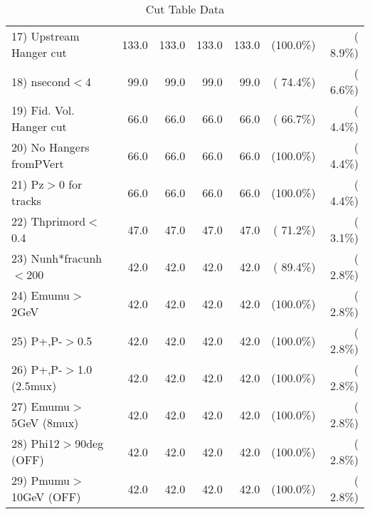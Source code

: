 \begin{table}[h!]
\begin{tabular}{||l||r|r|r|r|r|r||}
 17) Upstream Hanger cut  &        133.0 &        133.0 &        133.0 &        133.0 & (100.0\%) & (  8.9\%) \\
 18) nsecond$<$4          &         99.0 &         99.0 &         99.0 &         99.0 & ( 74.4\%) & (  6.6\%) \\
 19) Fid. Vol. Hanger cut &         66.0 &         66.0 &         66.0 &         66.0 & ( 66.7\%) & (  4.4\%) \\
 20) No Hangers fromPVert &         66.0 &         66.0 &         66.0 &         66.0 & (100.0\%) & (  4.4\%) \\
 21) Pz$>$0 for tracks    &         66.0 &         66.0 &         66.0 &         66.0 & (100.0\%) & (  4.4\%) \\
 22) Thprimord$<$0.4      &         47.0 &         47.0 &         47.0 &         47.0 & ( 71.2\%) & (  3.1\%) \\
 23) Nunh*fracunh$<$200   &         42.0 &         42.0 &         42.0 &         42.0 & ( 89.4\%) & (  2.8\%) \\
 24) Emumu$>$2GeV         &         42.0 &         42.0 &         42.0 &         42.0 & (100.0\%) & (  2.8\%) \\
 25) P+,P-$>$0.5          &         42.0 &         42.0 &         42.0 &         42.0 & (100.0\%) & (  2.8\%) \\
 26) P+,P-$>$1.0 (2.5mux) &         42.0 &         42.0 &         42.0 &         42.0 & (100.0\%) & (  2.8\%) \\
 27) Emumu$>$5GeV  (8mux) &         42.0 &         42.0 &         42.0 &         42.0 & (100.0\%) & (  2.8\%) \\
 28) Phi12$>$90deg  (OFF) &         42.0 &         42.0 &         42.0 &         42.0 & (100.0\%) & (  2.8\%) \\
 29) Pmumu$>$10GeV  (OFF) &         42.0 &         42.0 &         42.0 &         42.0 & (100.0\%) & (  2.8\%) \\
 \hline
 \hline
 \end{tabular}
 \caption{Cut Table  Data     }
 \label{tab-cutcohjpsi-mumu_data}
 \end{table}
